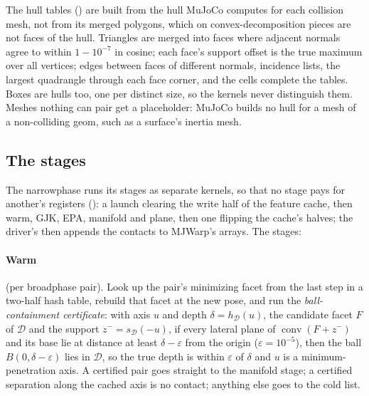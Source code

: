 The hull tables () are built from the hull MuJoCo computes for each collision mesh, not from its merged polygons, which on convex-decomposition pieces are not faces of the hull. Triangles are merged into faces where adjacent normals agree to within $1 - 10^{-7}$ in cosine; each face's support offset is the true maximum over all vertices; edges between faces of different normals, incidence lists, the largest quadrangle through each face corner, and the cells complete the tables. Boxes are hulls too, one per distinct size, so the kernels never distinguish them. Meshes nothing can pair get a placeholder: MuJoCo builds no hull for a mesh of a non-colliding geom, such as a surface's inertia mesh.

\subsection{The stages}\label{sec:hybridstages}

The narrowphase runs its stages as separate kernels, so that no stage pays for another's registers (): a launch clearing the write half of the feature cache, then warm, GJK, EPA, manifold and plane, then one flipping the cache's halves; the driver's  then appends the contacts to MJWarp's arrays. The stages:

\paragraph{Warm} (per broadphase pair). Look up the pair's minimizing facet from the last step in a two-half hash table, rebuild that facet at the new pose, and run the \emph{ball-containment certificate}: with axis $u$ and depth $\delta = h_{\mathcal D}(u)$, the candidate facet $F$ of $\mathcal D$ and the support $z^- = s_{\mathcal D}(-u)$, if every lateral plane of $\operatorname{conv}(F + z^-)$ and its base lie at distance at least $\delta - \varepsilon$ from the origin ($\varepsilon = 10^{-5}$), then the ball $B(0, \delta - \varepsilon)$ lies in $\mathcal D$, so the true depth is within $\varepsilon$ of $\delta$ and $u$ is a minimum-penetration axis. A certified pair goes straight to the manifold stage; a certified separation along the cached axis is no contact; anything else goes to the cold list.

